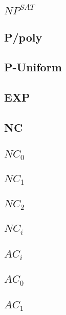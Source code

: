 \documentclass[]{article}
\theoremstyle{definition}
\begin{document}
\subsection{$NP^{SAT}$}

\subsection{P/poly}

\subsection{P-Uniform}

\subsection{EXP}

\subsection{NC}

\subsection{$NC_0$}

\subsection{$NC_1$}

\subsection{$NC_2$}

\subsection{$NC_i$}

\subsection{$AC_i$}

\subsection{$AC_0$}

\subsection{$AC_1$}
\end{document}
